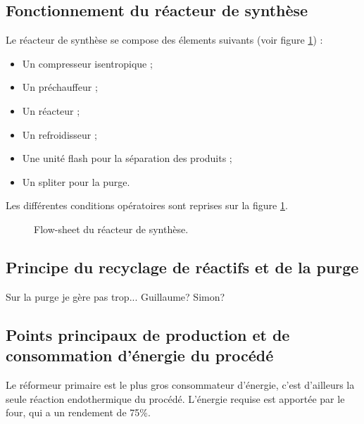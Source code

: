 \subsection{Fonctionnement du réacteur de synthèse}
Le réacteur de synthèse se compose des élements suivants 
(voir figure \ref{fig:flow-sheet-aspen}) :
\begin{itemize}
	\item Un compresseur isentropique ;
	\item Un préchauffeur ;
	\item Un réacteur ;
	\item Un refroidisseur ;
	\item Une unité flash pour la séparation des produits ;
	\item Un spliter pour la purge.
\end{itemize}
Les différentes conditions opératoires sont reprises
sur la figure \ref{fig:flow-sheet-aspen}.
\begin{figure}[ht!]
	\centering
	\caption{Flow-sheet du réacteur de synthèse.}
	\label{fig:flow-sheet-aspen}
\end{figure}

\subsection{Principe du recyclage de réactifs et de la purge}
Sur la purge je gère pas trop... Guillaume? Simon?

\subsection{Points principaux de production et de consommation d'énergie du procédé}
Le réformeur primaire est le plus gros consommateur d'énergie, c'est d'ailleurs
la seule réaction endothermique du procédé. L'énergie requise est apportée par
le four, qui a un rendement de 75\%.

